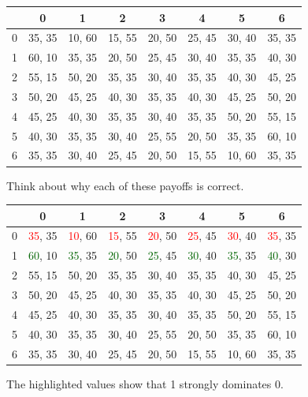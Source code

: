 \documentclass[
  14pt,
  letterpaper,
  ignorenonframetext,
  aspectratio=169,
]{beamer}
\begin{document}
\begin{frame}[plain]{}
\protect\hypertarget{section}{}
\begin{table}[!h]
\centering
\begin{tabular}[t]{>{}r|ccccccc}
\toprule
 & 0 & 1 & 2 & 3 & 4 & 5 & 6\\
\midrule
0 & 35, 35 & 10, 60 & 15, 55 & 20, 50 & 25, 45 & 30, 40 & 35, 35\\
1 & 60, 10 & 35, 35 & 20, 50 & 25, 45 & 30, 40 & 35, 35 & 40, 30\\
2 & 55, 15 & 50, 20 & 35, 35 & 30, 40 & 35, 35 & 40, 30 & 45, 25\\
3 & 50, 20 & 45, 25 & 40, 30 & 35, 35 & 40, 30 & 45, 25 & 50, 20\\
4 & 45, 25 & 40, 30 & 35, 35 & 30, 40 & 35, 35 & 50, 20 & 55, 15\\
5 & 40, 30 & 35, 35 & 30, 40 & 25, 55 & 20, 50 & 35, 35 & 60, 10\\
6 & 35, 35 & 30, 40 & 25, 45 & 20, 50 & 15, 55 & 10, 60 & 35, 35\\
\bottomrule
\end{tabular}
\end{table}

Think about why each of these payoffs is correct.
\end{frame}

\begin{frame}[plain]{}
\protect\hypertarget{section-1}{}
\begin{table}[!h]
\centering
\begin{tabular}[t]{>{}r|ccccccc}
\toprule
 & 0 & 1 & 2 & 3 & 4 & 5 & 6\\
\midrule
0 & \textcolor{red}{35}, 35 & \textcolor{red}{10}, 60 & \textcolor{red}{15}, 55 & \textcolor{red}{20}, 50 & \textcolor{red}{25}, 45 & \textcolor{red}{30}, 40 & \textcolor{red}{35}, 35\\
1 & \textcolor{darkgreen}{60}, 10 & \textcolor{darkgreen}{35}, 35 & \textcolor{darkgreen}{20}, 50 & \textcolor{darkgreen}{25}, 45 & \textcolor{darkgreen}{30}, 40 & \textcolor{darkgreen}{35}, 35 & \textcolor{darkgreen}{40}, 30\\
2 & 55, 15 & 50, 20 & 35, 35 & 30, 40 & 35, 35 & 40, 30 & 45, 25\\
3 & 50, 20 & 45, 25 & 40, 30 & 35, 35 & 40, 30 & 45, 25 & 50, 20\\
4 & 45, 25 & 40, 30 & 35, 35 & 30, 40 & 35, 35 & 50, 20 & 55, 15\\
5 & 40, 30 & 35, 35 & 30, 40 & 25, 55 & 20, 50 & 35, 35 & 60, 10\\
6 & 35, 35 & 30, 40 & 25, 45 & 20, 50 & 15, 55 & 10, 60 & 35, 35\\
\bottomrule
\end{tabular}
\end{table}

The highlighted values show that 1 strongly dominates 0.
\end{frame}
\end{document}
